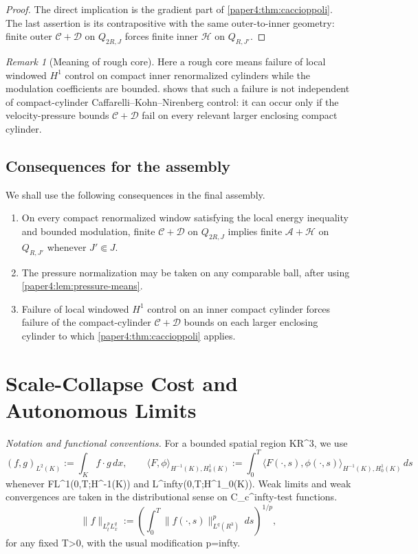 \documentclass[11pt]{amsart}
\def\({}%
\def\){}%
\def\mathbb#1{#1}%
\def\infty{infty}%
\theoremstyle{plain}
\theoremstyle{definition}
\theoremstyle{remark}
\newtheorem{remark}[theorem]{Remark}
\begin{document}
\begin{proof}
The direct implication is the gradient part of \cref{paper4:thm:caccioppoli}. The
last assertion is its contrapositive with the same outer-to-inner geometry:
finite outer $\mathcal C+\mathcal D$ on $Q_{2R,J}$ forces finite inner
$\mathcal H$ on $Q_{R,J'}$.
\end{proof}

\begin{remark}[Meaning of rough core]
Here a rough core means failure of local windowed $H^1$
control on compact inner renormalized cylinders while the modulation
coefficients are bounded.  shows that such a failure is
not independent of compact-cylinder Caffarelli--Kohn--Nirenberg control: it can
occur only if the velocity-pressure bounds $\mathcal C+\mathcal D$ fail on
every relevant larger enclosing compact cylinder.
\end{remark}

\subsection{Consequences for the assembly}

We shall use the following consequences in the final assembly.
\begin{enumerate}[label=\textup{(\arabic*)}]
\item On every compact renormalized window satisfying the local energy
inequality and bounded modulation, finite $\mathcal C+\mathcal D$ on
$Q_{2R,J}$ implies finite $\mathcal A+\mathcal H$ on $Q_{R,J'}$ whenever
$J'\Subset J$.
\item The pressure normalization may be taken on any comparable ball, after
using \cref{paper4:lem:pressure-means}.
\item Failure of local windowed $H^1$ control on an inner compact cylinder
forces failure of the compact-cylinder $\mathcal C+\mathcal D$ bounds on each
larger enclosing cylinder to which \cref{paper4:thm:caccioppoli} applies.
\end{enumerate}

\clearpage
\section{Scale-Collapse Cost and Autonomous Limits}\label{sec:scale-collapse-cost}
\medskip
\noindent\textit{Notation and functional conventions.}
For a bounded spatial region \(K\subset\mathbb R^3\), we use
\[
  (f,g)_{L^2(K)}:=\int_K f\cdot g\,dx,\qquad
  \langle F,\phi\rangle_{H^{-1}(K),H^1_0(K)}
  :=\int_0^T\langle F(\cdot,s),\phi(\cdot,s)\rangle_{H^{-1}(K),H^1_0(K)}\,ds
\]
whenever \(F\in L^1(0,T;H^{-1}(K))\) and \(\phi\in L^\infty(0,T;H^1_0(K))\). Weak limits and weak convergences are taken in the distributional sense on \(C_c^\infty\)-test functions.
\[
  \|f\|_{L^p_tL^q_x}:=\left(\int_0^T\|f(\cdot,s)\|_{L^q(\mathbb R^3)}^p\,ds\right)^{1/p},
\]
for any fixed \(T>0\), with the usual modification \(p=\infty\).
\end{document}
